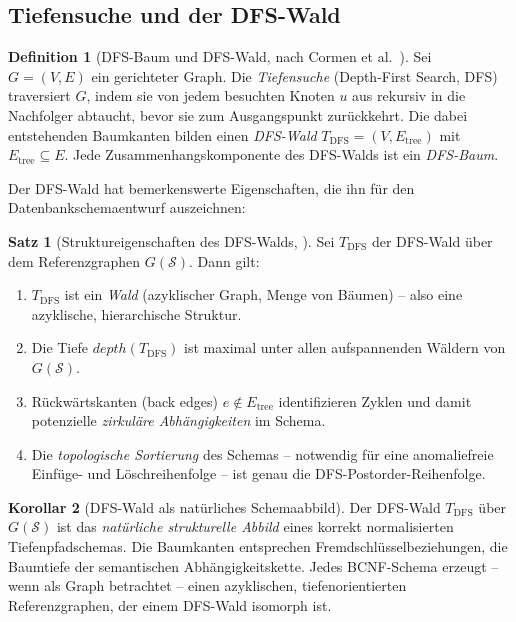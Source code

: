 ﻿\documentclass[a4paper,12pt]{report}
\theoremstyle{definition}
\newtheorem{definition}{Definition}[chapter]
\newtheorem{theorem}{Satz}[chapter]
\newtheorem{corollary}[theorem]{Korollar}
\theoremstyle{remark}
\newcommand{\depth}{\mathit{depth}}
\begin{document}
\subsection{Tiefensuche und der DFS-Wald}

\begin{definition}[DFS-Baum und DFS-Wald, nach Cormen et al.~\cite{Cormen2009}]
\label{def:dfswald}
Sei $G = (V, E)$ ein gerichteter Graph. Die \emph{Tiefensuche} (Depth-First
Search, DFS) traversiert $G$, indem sie von jedem besuchten Knoten $u$ aus
rekursiv in die Nachfolger abtaucht, bevor sie zum Ausgangspunkt zurückkehrt.
Die dabei entstehenden Baumkanten bilden einen \emph{DFS-Wald}
$T_{\mathrm{DFS}} = (V, E_{\mathrm{tree}})$ mit
$E_{\mathrm{tree}} \subseteq E$. Jede Zusammenhangskomponente des DFS-Walds
ist ein \emph{DFS-Baum}.
\end{definition}

Der DFS-Wald hat bemerkenswerte Eigenschaften, die ihn für den
Datenbankschemaentwurf auszeichnen:

\begin{theorem}[Struktureigenschaften des DFS-Walds, \cite{Cormen2009, Tarjan1972}]
\label{thm:dfswald}
Sei $T_{\mathrm{DFS}}$ der DFS-Wald über dem Referenzgraphen
$G(\mathcal{S})$. Dann gilt:
\begin{enumerate}[label=(\roman*)]
  \item $T_{\mathrm{DFS}}$ ist ein \emph{Wald} (azyklischer Graph, Menge
        von Bäumen) -- also eine azyklische, hierarchische Struktur.
  \item Die Tiefe $\depth(T_{\mathrm{DFS}})$ ist maximal unter allen
        aufspannenden Wäldern von $G(\mathcal{S})$.
  \item Rückwärtskanten (back edges) $e \notin E_{\mathrm{tree}}$ identifizieren
        Zyklen und damit potenzielle \emph{zirkuläre Abhängigkeiten} im Schema.
  \item Die \emph{topologische Sortierung} des Schemas -- notwendig für
        eine anomaliefreie Einfüge- und Löschreihenfolge -- ist
        genau die DFS-Postorder-Reihenfolge.
\end{enumerate}
\end{theorem}

\begin{corollary}[DFS-Wald als natürliches Schemaabbild]
Der DFS-Wald $T_{\mathrm{DFS}}$ über $G(\mathcal{S})$ ist das
\emph{natürliche strukturelle Abbild} eines korrekt normalisierten
Tiefenpfadschemas. Die Baumkanten entsprechen Fremdschlüsselbeziehungen,
die Baumtiefe der semantischen Abhängigkeitskette.
Jedes BCNF-Schema erzeugt -- wenn als Graph betrachtet -- einen azyklischen,
tiefenorientierten Referenzgraphen, der einem DFS-Wald isomorph ist.
\end{corollary}
\end{document}
